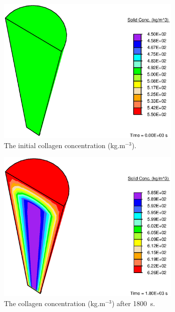 \begin{figure}[!hpt]
  \centering
  \includegraphics[width=0.8\textwidth]{images/examples/lagrangian/swelling/before-growth}
  \caption{The initial collagen concentration (kg.m$^{-3}$).}
  \label{before_growth}
\end{figure}

\begin{figure}[!hpt]
  \centering
  \includegraphics[width=0.8\textwidth]{images/examples/lagrangian/swelling/after-growth}
  \caption{The collagen concentration (kg.m$^{-3}$) after 1800~s.}
  \label{after_growth}
\end{figure}

